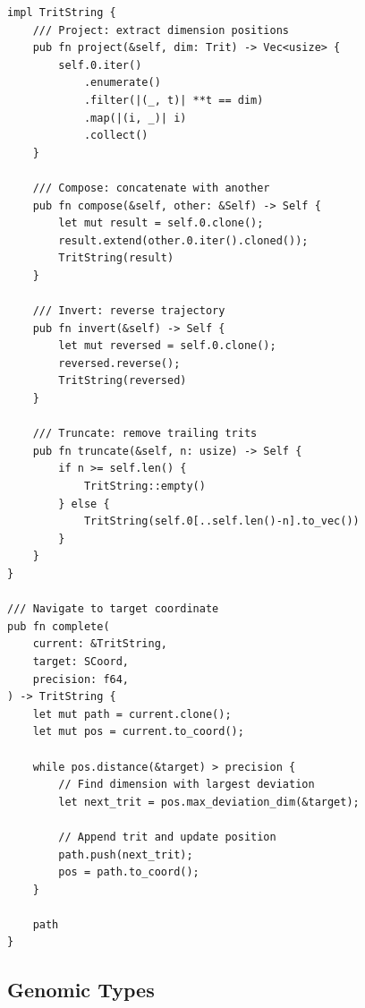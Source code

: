 \documentclass[twocolumn,10pt]{article}
\theoremstyle{remark}
\begin{document}
\begin{lstlisting}[style=rust]
impl TritString {
    /// Project: extract dimension positions
    pub fn project(&self, dim: Trit) -> Vec<usize> {
        self.0.iter()
            .enumerate()
            .filter(|(_, t)| **t == dim)
            .map(|(i, _)| i)
            .collect()
    }

    /// Compose: concatenate with another
    pub fn compose(&self, other: &Self) -> Self {
        let mut result = self.0.clone();
        result.extend(other.0.iter().cloned());
        TritString(result)
    }

    /// Invert: reverse trajectory
    pub fn invert(&self) -> Self {
        let mut reversed = self.0.clone();
        reversed.reverse();
        TritString(reversed)
    }

    /// Truncate: remove trailing trits
    pub fn truncate(&self, n: usize) -> Self {
        if n >= self.len() {
            TritString::empty()
        } else {
            TritString(self.0[..self.len()-n].to_vec())
        }
    }
}

/// Navigate to target coordinate
pub fn complete(
    current: &TritString,
    target: SCoord,
    precision: f64,
) -> TritString {
    let mut path = current.clone();
    let mut pos = current.to_coord();

    while pos.distance(&target) > precision {
        // Find dimension with largest deviation
        let next_trit = pos.max_deviation_dim(&target);

        // Append trit and update position
        path.push(next_trit);
        pos = path.to_coord();
    }

    path
}
\end{lstlisting}

\subsection{Genomic Types}
\end{document}
